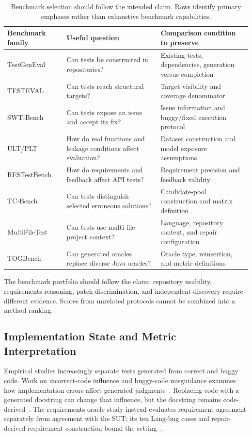 \begin{table}[t]
\caption{Benchmark selection should follow the intended claim. Rows identify primary emphases rather than exhaustive benchmark capabilities.}
\label{tab:benchmarks}
\small
\begin{tabularx}{\linewidth}{@{}p{.22\linewidth}YY@{}}
\toprule
Benchmark family & Useful question & Comparison condition to preserve \\
\midrule
TestGenEval~\cite{B01} & Can tests be constructed in repositories? & Existing tests, dependencies, generation versus completion \\
TESTEVAL~\cite{B02} & Can tests reach structural targets? & Target visibility and coverage denominator \\
SWT-Bench~\cite{B03} & Can tests expose an issue and accept its fix? & Issue information and buggy/fixed execution protocol \\
ULT/PLT~\cite{B04} & How do real functions and leakage conditions affect evaluation? & Dataset construction and model exposure assumptions \\
RESTestBench~\cite{B05} & How do requirements and feedback affect API tests? & Requirement precision and feedback validity \\
TC-Bench~\cite{B06} & Can tests distinguish selected erroneous solutions? & Candidate-pool construction and matrix definition \\
MultiFileTest~\cite{B07} & Can tests use multi-file project context? & Language, repository context, and repair configuration \\
TOGBench~\cite{B08} & Can generated oracles replace diverse Java oracles? & Oracle type, reinsertion, and metric definitions \\
\bottomrule
\end{tabularx}
\end{table}

The benchmark portfolio should follow the claim: repository usability, requirements reasoning, patch discrimination, and independent discovery require different evidence. Scores from unrelated protocols cannot be combined into a method ranking.

\subsection{Implementation State and Metric Interpretation}
Empirical studies increasingly separate tests generated from correct and buggy code. Work on incorrect-code influence and buggy-code misguidance examines how implementation errors affect generated judgments~\cite{E04,E06}. Replacing code with a generated docstring can change that influence, but the docstring remains code-derived~\cite{E06}. The requirements-oracle study instead evaluates requirement agreement separately from agreement with the SUT; its ten Lang-bug cases and repair-derived requirement construction bound the setting~\cite{O12}.

